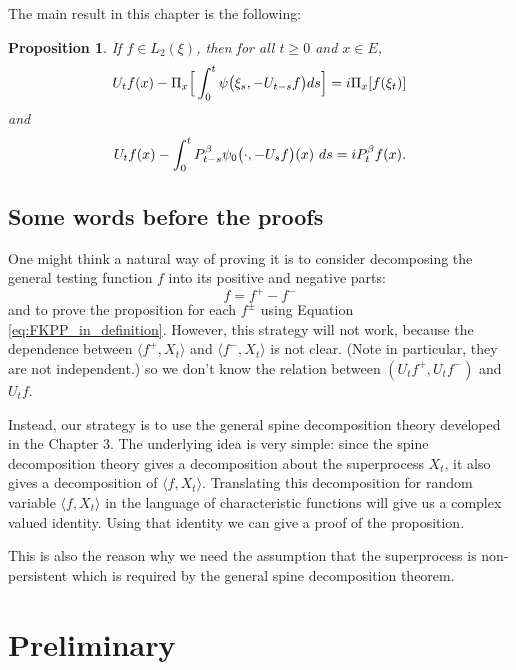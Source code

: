 \documentclass[UTF8]{pkuthss}
\theoremstyle{plain}
\newtheorem{prop}[thm]{Proposition}
\theoremstyle{definition}
\numberwithin{equation}{section}
\begin{document}
    The main result in this chapter is the following:
\begin{prop}
\label{prop: complex FKPP-equation}
    If $f\in L_2(\xi)$,  then for all $t\geq 0$ and $x\in E$,
\begin{equation}
\label{eq: complex FKPP-equation}
    U_tf(x) - \Pi_x \Big[\int_0^t \psi\big(\xi_s, - U_{t-s}f\big) ds \Big]
    \\= i \Pi_x [f(\xi_t)]
\end{equation}
    and
\begin{equation}
\label{eq: complex FKPP-equation with FK-transform}
    U_tf(x) -  \int_0^t P_{t-s}^{\beta} \psi_0\big(\cdot,-U_sf\big) (x)~ds
    \\= iP_t^{\beta} f(x).
\end{equation}
\end{prop}

\subsection{Some words before the proofs}
	One might think a natural way of proving it is to consider decomposing the general testing function $f$ into its positive and negative parts:
\[
	f= f^+ -f^-
\]
	and to prove the proposition for each $f^\pm$ using Equation \eqref{eq:FKPP_in_definition}.
	However, this strategy will not work, because the dependence between $\langle f^+,X_t\rangle$ and $\langle f^-,X_t\rangle $ is not clear. (Note in particular, they are not independent.) so we don't know the relation between $(U_tf^+,U_tf^-)$ and $U_tf$.

	Instead, our strategy is to use the general spine decomposition theory developed in the Chapter 3. 
	The underlying idea is very simple: since the spine decomposition theory gives a decomposition about the superprocess $X_t$, it also gives a decomposition of $\langle f,X_t\rangle$. 
	Translating this decomposition for random variable $\langle f,X_t\rangle$ in the language of characteristic functions will give us a complex valued identity. 
	Using that identity we can give a proof of the proposition.

	This is also the reason why we need the assumption that the superprocess is non-persistent which is required by the general spine decomposition theorem. 

\section{Preliminary}
\end{document}
